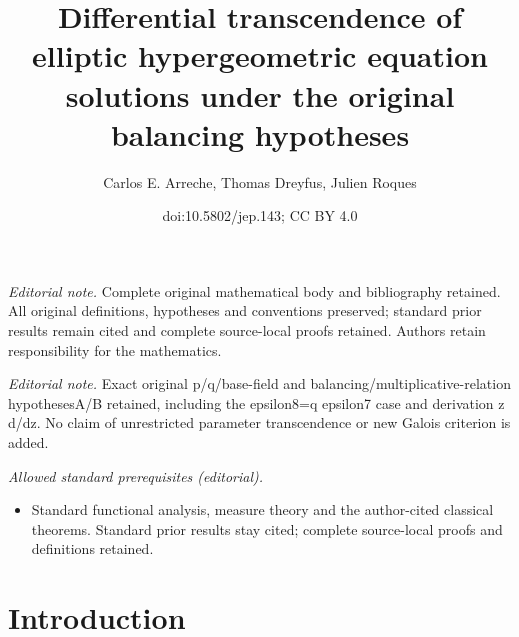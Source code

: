 \documentclass[10pt]{amsart}
\title{Differential transcendence of elliptic hypergeometric equation solutions under the original balancing hypotheses}
\author{Carlos E. Arreche, Thomas Dreyfus, Julien Roques}
\date{doi:10.5802/jep.143; CC BY 4.0}
\theoremstyle{definition}
\providecommand{\mainmatter}{}\providecommand{\backmatter}{}
\begin{document}
\maketitle
\noindent\textit{Editorial note.} Complete original mathematical body and bibliography retained. All original definitions, hypotheses and conventions preserved; standard prior results remain cited and complete source-local proofs retained. Authors retain responsibility for the mathematics.\par\medskip
\noindent\textit{Editorial note.} Exact original p/q/base-field and balancing/multiplicative-relation hypothesesA/B retained, including the epsilon8=q epsilon7 case and derivation z d/dz. No claim of unrestricted parameter transcendence or new Galois criterion is added.\par\medskip
\noindent\textit{Allowed standard prerequisites (editorial).}\begin{itemize}
\item Standard functional analysis, measure theory and the author-cited classical theorems. Standard prior results stay cited; complete source-local proofs and definitions retained.
\end{itemize}\medskip
\tableofcontents
\mainmatter

\section{Introduction}
\end{document}
